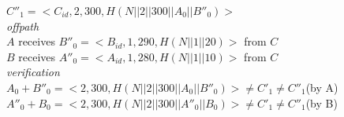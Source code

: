 \begin{exmp}
		$C''_{1} = <C_{id},2,300, H(N||2||300||A_{0}||B''_{0})>$\\
		\textit{offpath}\\
		$A$ receives $B''_{0} = <B_{id},1,290,H(N||1||20)>$ from $C$\\
		$B$ receives $A''_{0} = <A_{id},1,280,H(N||1||10)>$ from $C$\\
		\textit{verification}\\
		$A_{0}+B''_{0} = <2,300,H(N||2||300||A_{0}||B''_{0})> \neq C'_{1} \neq C''_{1}$(by A)\\
		$A''_{0}+B_{0} = <2,300,H(N||2||300||A''_{0}||B_{0})> \neq C'_{1} \neq C''_{1}$(by B)\\
	\end{exmp}

	
  
  





